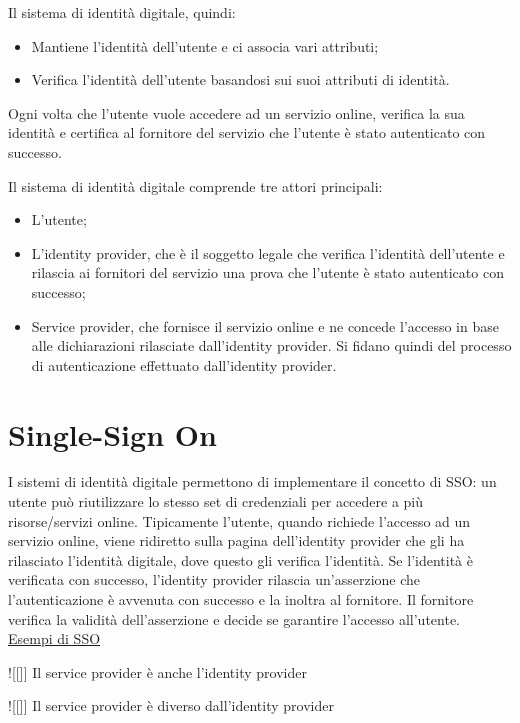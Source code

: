 \noindent Il sistema di identità digitale, quindi:
\begin{itemize}
    \item Mantiene l'identità dell'utente e ci associa vari attributi;
    \item Verifica l'identità dell'utente basandosi sui suoi attributi di identità.
\end{itemize}

Ogni volta che l'utente vuole accedere ad un servizio online, verifica la sua identità e certifica al fornitore del servizio che l'utente è stato autenticato con successo. 

\noindent Il sistema di identità digitale comprende tre attori principali:
\begin{itemize}
    \item L'utente;
    \item L'identity provider, che è il soggetto legale che verifica l'identità dell'utente e rilascia ai fornitori del servizio una prova che l'utente è stato autenticato con successo;
    \item Service provider, che fornisce il servizio online e ne concede l'accesso in base alle dichiarazioni rilasciate dall'identity provider. Si fidano quindi del processo di autenticazione effettuato dall'identity provider.
\end{itemize}

\section{Single-Sign On}
I sistemi di identità digitale permettono di implementare il concetto di SSO: un utente può riutilizzare lo stesso set di credenziali per accedere a più risorse/servizi online. Tipicamente l'utente, quando richiede l'accesso ad un servizio online, viene ridiretto sulla pagina dell'identity provider che gli ha rilasciato l'identità digitale, dove questo gli verifica l'identità. Se l'identità è verificata con successo, l'identity provider rilascia un'asserzione che l'autenticazione è avvenuta con successo e la inoltra al fornitore. Il fornitore verifica la validità dell'asserzione e decide se garantire l'accesso all'utente. 
\\

\noindent \underline{Esempi di SSO}

![[]] {Il service provider è anche l'identity provider}

![[]] {Il service provider è diverso dall'identity provider}

